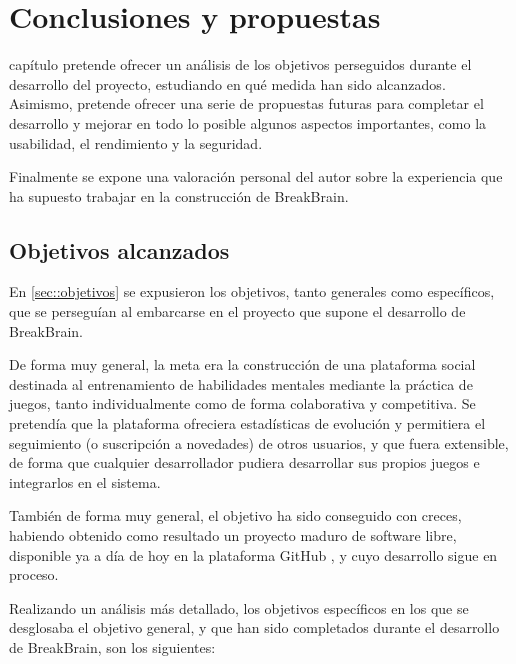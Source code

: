 \chapter{Conclusiones y propuestas}
\label{chap:conclusiones}

 capítulo pretende ofrecer un análisis de los objetivos perseguidos durante el desarrollo del proyecto, estudiando en qué medida han sido alcanzados. Asimismo, pretende ofrecer una serie de propuestas futuras para completar el desarrollo y mejorar en todo lo posible algunos aspectos importantes, como la usabilidad, el rendimiento y la seguridad.

Finalmente se expone una valoración personal del autor sobre la experiencia que ha supuesto trabajar en la construcción de BreakBrain.

\section{Objetivos alcanzados}

En \ref{sec::objetivos} se expusieron los objetivos, tanto generales como específicos, que se perseguían al embarcarse en el proyecto que supone el desarrollo de BreakBrain.

De forma muy general, la meta era la construcción de una plataforma social destinada al entrenamiento de habilidades mentales mediante la práctica de juegos, tanto individualmente como de forma colaborativa y competitiva. Se pretendía que la plataforma ofreciera estadísticas de evolución y permitiera el seguimiento (o suscripción a novedades) de otros usuarios, y que fuera extensible, de forma que cualquier desarrollador pudiera desarrollar sus propios juegos e integrarlos en el sistema.

También de forma muy general, el objetivo ha sido conseguido con creces, habiendo obtenido como resultado un proyecto maduro de software libre, disponible ya a día de hoy en la plataforma GitHub \cite{github}, y cuyo desarrollo sigue en proceso.

Realizando un análisis más detallado, los objetivos específicos en los que se desglosaba el objetivo general, y que han sido completados durante el desarrollo de BreakBrain, son los siguientes:

